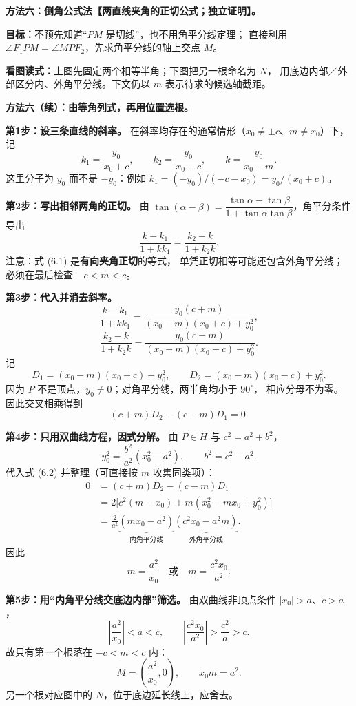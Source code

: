 \clearpage
\begin{proofbox}
\textbf{方法六：倒角公式法【两直线夹角的正切公式；独立证明】。}

\textbf{目标：}不预先知道“$PM$ 是切线”，也不用角平分线定理；
直接利用 $\angle F_1PM=\angle MPF_2$，先求角平分线的轴上交点 $M$。


\textbf{看图读式：}上图先固定两个相等半角；下图把另一根命名为 $N$，
用底边内部／外部区分内、外角平分线。下文仍以 $m$ 表示待求的候选轴截距。
\end{proofbox}
\clearpage
\begin{proofbox}
\textbf{方法六（续）：由等角列式，再用位置选根。}

\textbf{第1步：设三条直线的斜率。}
在斜率均存在的通常情形（$x_0\ne\pm c$、$m\ne x_0$）下，记
\[
\boxed{k_1=\frac{y_0}{x_0+c}},\qquad
\boxed{k_2=\frac{y_0}{x_0-c}},\qquad
\boxed{k=\frac{y_0}{x_0-m}}.
\]
这里分子为 $y_0$ 而不是 $-y_0$：例如
$k_1=(-y_0)/(-c-x_0)=y_0/(x_0+c)$。

\textbf{第2步：写出相邻两角的正切。}
由 $\tan(\alpha-\beta)=\dfrac{\tan\alpha-\tan\beta}
{1+\tan\alpha\tan\beta}$，角平分条件导出
\[
\boxed{\frac{k-k_1}{1+kk_1}=\frac{k_2-k}{1+k_2k}}.\tag{6.1}
\]
注意：式 (6.1) 是\textbf{有向夹角正切}的等式，
单凭正切相等可能还包含外角平分线；必须在最后检查 $-c<m<c$。

\textbf{第3步：代入并消去斜率。}
\[
\frac{k-k_1}{1+kk_1}
=\frac{y_0(c+m)}{(x_0-m)(x_0+c)+y_0^2},
\]
\[
\frac{k_2-k}{1+k_2k}
=\frac{y_0(c-m)}{(x_0-m)(x_0-c)+y_0^2}.
\]
记
\[
D_1=(x_0-m)(x_0+c)+y_0^2,\qquad
D_2=(x_0-m)(x_0-c)+y_0^2.
\]
因为 $P$ 不是顶点，$y_0\ne0$；对角平分线，两半角均小于 $90^\circ$，
相应分母不为零。因此交叉相乘得到
\[
(c+m)D_2-(c-m)D_1=0.\tag{6.2}
\]

\textbf{第4步：只用双曲线方程，因式分解。}
由 $P\in H$ 与 $c^2=a^2+b^2$，
\[
\boxed{y_0^2=\frac{b^2}{a^2}(x_0^2-a^2)},\qquad b^2=c^2-a^2.
\]
代入式 (6.2) 并整理（可直接按 $m$ 收集同类项）：
\[
\begin{aligned}
0&=(c+m)D_2-(c-m)D_1\\
 &=2\bigl[c^2(m-x_0)+m(x_0^2-mx_0+y_0^2)\bigr]\\
 &=\frac{2}{a^2}\underbrace{(mx_0-a^2)}_{\text{内角平分线}}
                   \underbrace{(c^2x_0-a^2m)}_{\text{外角平分线}}.
\end{aligned}
\]
因此
\[
\boxed{m=\frac{a^2}{x_0}}\quad\text{或}\quad
\boxed{m=\frac{c^2x_0}{a^2}}.
\]

\textbf{第5步：用“内角平分线交底边内部”筛选。}
由双曲线非顶点条件 $|x_0|>a$、$c>a$，
\[
\left|\frac{a^2}{x_0}\right|<a<c,
\qquad
\left|\frac{c^2x_0}{a^2}\right|>\frac{c^2}{a}>c.
\]
故只有第一个根落在 $-c<m<c$ 内：
\[
\boxed{M=\left(\frac{a^2}{x_0},0\right)},\qquad
\boxed{x_0m=a^2}.
\]
另一个根对应图中的 $N$，位于底边延长线上，应舍去。


\end{proofbox}
